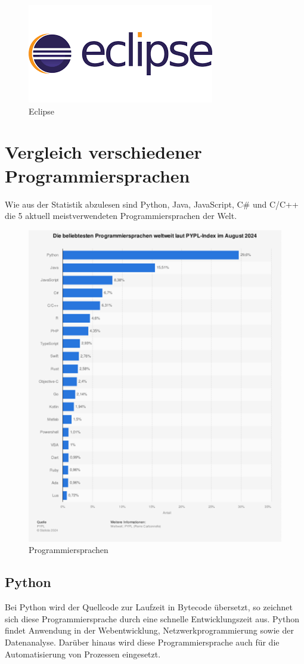 \begin{figure}[H]
	\centering
	\includegraphics[width=0.5\linewidth]{images/eclipse.png}
	\caption[Eclipse]{Eclipse}
	\label{fig:Eclipse}
\end{figure}

\section {Vergleich verschiedener Programmiersprachen}
Wie aus der Statistik abzulesen sind Python, Java, JavaScript, C\# und C/C++ die 5 aktuell meistverwendeten Programmiersprachen der Welt. \textcite{meistProgrammiersprachen}


\begin{figure}[H]
	\centering
	\includegraphics[width=0.7\linewidth]{images/Programmiersprachen.png}
	\caption[Programmiersprachen]{Programmiersprachen}
	\label{fig:Programmiersprachen}
\end{figure}

\subsection{Python}
Bei Python wird der Quellcode zur Laufzeit in Bytecode übersetzt, so zeichnet sich diese Programmiersprache durch eine schnelle Entwicklungszeit aus. Python findet Anwendung in der Webentwicklung, Netzwerkprogrammierung sowie der Datenanalyse. Darüber hinaus wird diese Programmiersprache auch für die Automatisierung von Prozessen eingesetzt. \textcite{Programmiersprachen}


